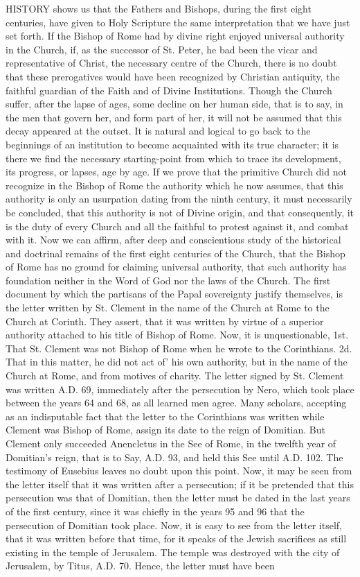 HISTORY shows us that the Fathers and Bishops, during the first eight centuries, have given to Holy Scripture the same interpretation that we have just set forth. If the Bishop of Rome had by divine right enjoyed universal authority in the Church, if, as the successor of St. Peter, he bad been the vicar and representative of Christ, the necessary centre of the Church, there is no doubt that these prerogatives would have been recognized by Christian antiquity, the faithful guardian of the Faith and of Divine Institutions. Though the Church suffer, after the lapse of ages, some decline on her human side, that is to say, in the men that govern her, and form part of her, it will not be assumed that this decay appeared at the outset. It is natural and logical to go back to the beginnings of an institution to become acquainted with its true character; it is there we find the necessary starting-point from which to trace its development, its progress, or lapses, age by age. If we prove that the primitive Church did not recognize in the Bishop of Rome the authority which he now assumes, that this authority is only an usurpation dating from the ninth century, it must necessarily be concluded, that this authority is not of Divine origin, and that consequently, it is the duty of every Church and all the faithful to protest against it, and combat with it. Now we can affirm, after deep and conscientious study of the historical and doctrinal remains of the first eight centuries of the Church, that the Bishop of Rome has no ground for claiming universal authority, that such authority has foundation neither in the Word of God nor the laws of the Church. The first document by which the partisans of the Papal sovereignty justify themselves, is the letter written by St. Clement in the name of the Church at Rome to the Church at Corinth. They assert, that it was written by virtue of a superior authority attached to his title of Bishop of Rome. Now, it is unquestionable, 1st. That St. Clement was not Bishop of Rome when he wrote to the Corinthians. 2d. That in this matter, he did not act of' his own authority, but in the name of the Church at Rome, and from motives of charity. The letter signed by St. Clement was written A.D. 69, immediately after the persecution by Nero, which took place between the years 64 and 68, as all learned men agree. Many scholars, accepting as an indisputable fact that the letter to the Corinthians was written while Clement was Bishop of Rome, assign its date to the reign of Domitian. But Clement only succeeded Anencletus in the See of Rome, in the twelfth year of Domitian's reign, that is to Say, A.D. 93, and held this See until A.D. 102. The testimony of Eusebius leaves no doubt upon this point. Now, it may be seen from the letter itself that it was written after a persecution; if it be pretended that this persecution was that of Domitian, then the letter must be dated in the last years of the first century, since it was chiefly in the years 95 and 96 that the persecution of Domitian took place. Now, it is easy to see from the letter itself, that it was written before that time, for it speaks of the Jewish sacrifices as still existing in the temple of Jerusalem. The temple was destroyed with the city of Jerusalem, by Titus, A.D. 70. Hence, the letter must have been 